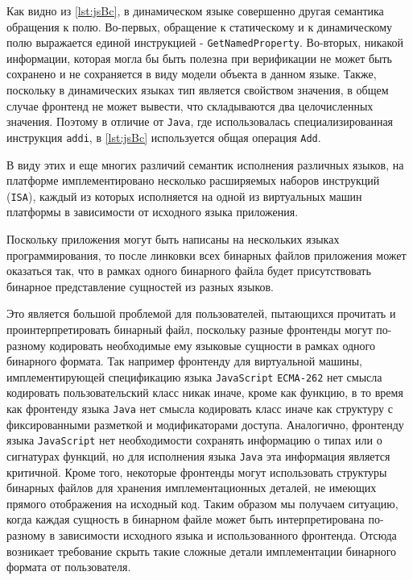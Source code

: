 Как видно из \autoref{lst:jsBc}, в динамическом языке совершенно другая семантика обращения к полю. Во-первых, обращение к статическому и к динамическому полю выражается единой инструкцией - \texttt{GetNamedProperty}. Во-вторых, никакой информации, которая могла бы быть полезна при верификации не может быть сохранено и не сохраняется в виду модели объекта в данном языке. Также, поскольку в динамических языках тип является свойством значения, в общем случае фронтенд не может вывести, что складываются два целочисленных значения. Поэтому в отличие от \texttt{Java}, где использовалась специализированная инструкция \texttt{addi}, в \autoref{lst:jsBc} используется общая операция \texttt{Add}.

В виду этих и еще многих различий семантик исполнения различных языков, на платформе имплементировано несколько расширяемых наборов инструкций (\texttt{ISA}), каждый из которых исполняется на одной из виртуальных машин платформы в зависимости от исходного языка приложения.

Поскольку приложения могут быть написаны на нескольких языках программирования, то после линковки всех бинарных файлов приложения может оказаться так, что в рамках одного бинарного файла будет присутствовать бинарное представление сущностей из разных языков.

Это является большой проблемой для пользователей, пытающихся прочитать и проинтерпретировать бинарный файл, поскольку разные фронтенды могут по-разному кодировать необходимые ему языковые сущности в рамках одного бинарного формата. Так например фронтенду для виртуальной машины, имплементирующей спецификацию языка \texttt{JavaScript} \texttt{ECMA-262} нет смысла кодировать пользовательский класс никак иначе, кроме как функцию, в то время как фронтенду языка \texttt{Java} нет смысла кодировать класс иначе как структуру с фиксированными разметкой и модификаторами доступа. Аналогично, фронтенду языка \texttt{JavaScript} нет необходимости сохранять информацию о типах или о сигнатурах функций, но для исполнения языка \texttt{Java} эта информация является критичной. Кроме того, некоторые фронтенды могут использовать структуры бинарных файлов для хранения имплементационных деталей, не имеющих прямого отображения на исходный код. Таким образом мы получаем ситуацию, когда каждая сущность в бинарном файле может быть интерпретирована по-разному в зависимости исходного языка и использованного фронтенда. Отсюда возникает требование скрыть такие сложные детали имплементации бинарного формата от пользователя.

